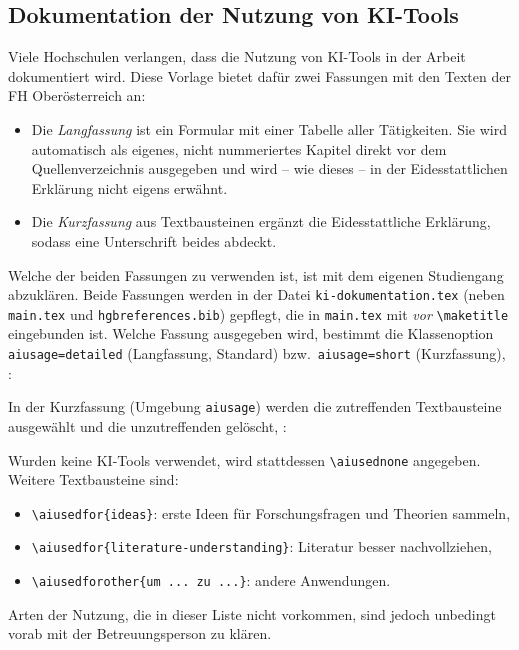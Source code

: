 \subsection{Dokumentation der Nutzung von KI-Tools}
\label{sec:KIDokumentation}

Viele Hochschulen verlangen, dass die Nutzung von KI-Tools in der Arbeit
dokumentiert wird. Diese Vorlage bietet dafür zwei Fassungen mit den Texten der
FH Oberösterreich an:
%
\begin{itemize}
    \item Die \emph{Langfassung} ist ein Formular mit einer Tabelle aller
    Tätigkeiten. Sie wird automatisch als eigenes, nicht nummeriertes Kapitel
    direkt vor dem Quellenverzeichnis ausgegeben und wird -- wie dieses -- in
    der Eidesstattlichen Erklärung nicht eigens erwähnt.
    \item Die \emph{Kurzfassung} aus Textbausteinen ergänzt die
    Eidesstattliche Erklärung, sodass eine Unterschrift beides abdeckt.
\end{itemize}
%
Welche der beiden Fassungen zu verwenden ist, ist mit dem eigenen Studiengang
abzuklären. Beide Fassungen werden in der Datei
\verb!ki-dokumentation.tex! (neben \verb!main.tex! und \verb!hgbreferences.bib!)
gepflegt, die in \verb!main.tex! mit
\verb!! \emph{vor} \verb!\maketitle! eingebunden ist. Welche Fassung
ausgegeben wird, bestimmt die Klassenoption \texttt{aiusage=detailed}
(Langfassung, Standard) bzw.\ \texttt{aiusage=short} (Kurzfassung), \zB:
%
%
In der Kurzfassung (Umgebung \texttt{aiusage}) werden die zutreffenden
Textbausteine ausgewählt und die unzutreffenden gelöscht, \zB:
%
\begin{LaTeXCode}[numbers=none]
\begin{aiusage}
\end{aiusage}
\end{LaTeXCode}
%
Wurden keine KI-Tools verwendet, wird stattdessen \verb!\aiusednone!
angegeben. Weitere Textbausteine sind:
%
\begin{itemize}
    \item \verb!!: erste Ideen für Forschungsfragen und
    Theorien sammeln,
    \item \verb!!: Literatur besser
    nachvollziehen,
    \item \verb!!: andere Anwendungen.
\end{itemize}
%
Arten der Nutzung, die in dieser Liste nicht vorkommen, sind jedoch unbedingt
vorab mit der Betreuungsperson zu klären.

